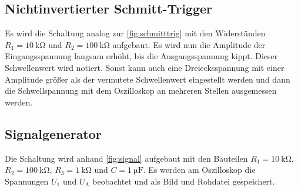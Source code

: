     \subsection{Nichtinvertierter Schmitt-Trigger}

        \noindent 
        Es wird die Schaltung analog zur \autoref{fig:schmitttrig} mit den Widerständen $R_1 = \SI{10}{\kilo\ohm}$ und $R_2 = \SI{100}{\kilo\ohm}$ 
        aufgebaut. 
        Es wird nun die Amplitude der Eingangsspannung langsam erhöht, bis die Ausgangsspannung kippt. Dieser Schwellenwert wird notiert. 
        Sonst kann auch eine Dreiecksspannung mit einer Amplitude größer als der vermutete Schwellenwert eingestellt werden und dann die 
        Schwellspannung mit dem Oszilloskop an mehreren Stellen ausgemessen werden. 

    \subsection{Signalgenerator}

        \noindent 
        Die Schaltung wird anhand \autoref{fig:signal} aufgebaut mit den Bauteilen $R_1 = \SI{10}{\kilo\ohm}$, $R_2 = \SI{100}{\kilo\ohm}$, 
        $R_3 = \SI{1}{\kilo\ohm}$ und $C = \SI{1}{\micro\farad}$. 
        Es werden am Oszilloskop die Spannungen $U_1$ und $U_\text{A}$ beobachtet und als Bild und Rohdatei gespeichert. 